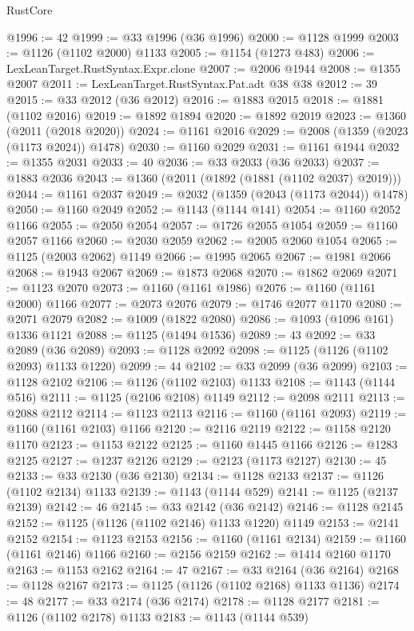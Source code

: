 \begin{lexlean}{RustCore}
\begin{coremodule}
@1996 := 42
@1999 := @33 @1996 (@36 @1996)
@2000 := @1128 @1999
@2003 := @1126 (@1102 @2000) @1133
@2005 := @1154 (@1273 @483)
@2006 := LexLeanTarget.RustSyntax.Expr.clone
@2007 := @2006 @1944
@2008 := @1355 @2007
@2011 := LexLeanTarget.RustSyntax.Pat.adt @38 @38
@2012 := 39
@2015 := @33 @2012 (@36 @2012)
@2016 := @1883 @2015
@2018 := @1881 (@1102 @2016)
@2019 := @1892 @1894
@2020 := @1892 @2019
@2023 := @1360 (@2011 (@2018 @2020))
@2024 := @1161 @2016
@2029 := @2008 (@1359 (@2023 (@1173 @2024)) @1478)
@2030 := @1160 @2029
@2031 := @1161 @1944
@2032 := @1355 @2031
@2033 := 40
@2036 := @33 @2033 (@36 @2033)
@2037 := @1883 @2036
@2043 := @1360 (@2011 (@1892 (@1881 (@1102 @2037) @2019)))
@2044 := @1161 @2037
@2049 := @2032 (@1359 (@2043 (@1173 @2044)) @1478)
@2050 := @1160 @2049
@2052 := @1143 (@1144 @141)
@2054 := @1160 @2052 @1166
@2055 := @2050 @2054
@2057 := @1726 @2055 @1054
@2059 := @1160 @2057 @1166
@2060 := @2030 @2059
@2062 := @2005 @2060 @1054
@2065 := @1125 (@2003 @2062) @1149
@2066 := @1995 @2065
@2067 := @1981 @2066
@2068 := @1943 @2067
@2069 := @1873 @2068
@2070 := @1862 @2069
@2071 := @1123 @2070
@2073 := @1160 (@1161 @1986)
@2076 := @1160 (@1161 @2000) @1166
@2077 := @2073 @2076
@2079 := @1746 @2077 @1170
@2080 := @2071 @2079
@2082 := @1009 (@1822 @2080)
@2086 := @1093 (@1096 @161) @1336 @1121
@2088 := @1125 (@1494 @1536)
@2089 := 43
@2092 := @33 @2089 (@36 @2089)
@2093 := @1128 @2092
@2098 := @1125 (@1126 (@1102 @2093) @1133 @1220)
@2099 := 44
@2102 := @33 @2099 (@36 @2099)
@2103 := @1128 @2102
@2106 := @1126 (@1102 @2103) @1133
@2108 := @1143 (@1144 @516)
@2111 := @1125 (@2106 @2108) @1149
@2112 := @2098 @2111
@2113 := @2088 @2112
@2114 := @1123 @2113
@2116 := @1160 (@1161 @2093)
@2119 := @1160 (@1161 @2103) @1166
@2120 := @2116 @2119
@2122 := @1158 @2120 @1170
@2123 := @1153 @2122
@2125 := @1160 @1445 @1166
@2126 := @1283 @2125
@2127 := @1237 @2126
@2129 := @2123 (@1173 @2127)
@2130 := 45
@2133 := @33 @2130 (@36 @2130)
@2134 := @1128 @2133
@2137 := @1126 (@1102 @2134) @1133
@2139 := @1143 (@1144 @529)
@2141 := @1125 (@2137 @2139)
@2142 := 46
@2145 := @33 @2142 (@36 @2142)
@2146 := @1128 @2145
@2152 := @1125 (@1126 (@1102 @2146) @1133 @1220) @1149
@2153 := @2141 @2152
@2154 := @1123 @2153
@2156 := @1160 (@1161 @2134)
@2159 := @1160 (@1161 @2146) @1166
@2160 := @2156 @2159
@2162 := @1414 @2160 @1170
@2163 := @1153 @2162
@2164 := 47
@2167 := @33 @2164 (@36 @2164)
@2168 := @1128 @2167
@2173 := @1125 (@1126 (@1102 @2168) @1133 @1136)
@2174 := 48
@2177 := @33 @2174 (@36 @2174)
@2178 := @1128 @2177
@2181 := @1126 (@1102 @2178) @1133
@2183 := @1143 (@1144 @539)

\end{coremodule}
\end{lexlean}
